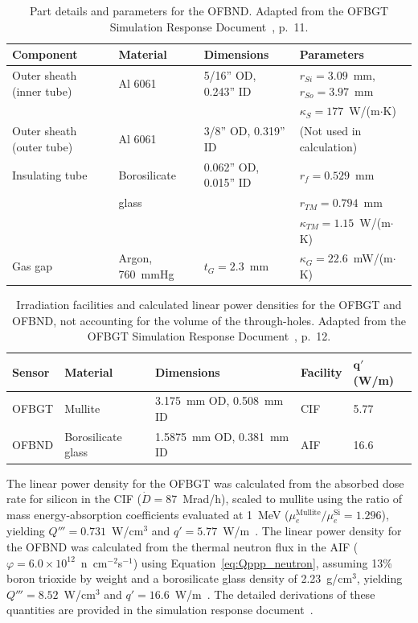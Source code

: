 \begin{table}[htbp]
\centering
\caption[OFBND design parameters.]{Part details and parameters for the OFBND.  Adapted from the OFBGT Simulation Response Document~\cite{SimReport2023}, p.~11.}
\label{tab:ofbnd_params}
\begin{tabular}{l l l l}
\hline
\textbf{Component} & \textbf{Material} & \textbf{Dimensions} & \textbf{Parameters} \\
\hline
Outer sheath (inner tube) & Al 6061 & 5/16'' OD, 0.243'' ID & $r_{Si} = 3.09$~mm, $r_{So} = 3.97$~mm \\
 & & & $\kappa_S = 177$~W/(m$\cdot$K) \\
Outer sheath (outer tube) & Al 6061 & 3/8'' OD, 0.319'' ID & (Not used in calculation) \\
Insulating tube & Borosilicate & 0.062'' OD, 0.015'' ID & $r_f = 0.529$~mm \\
 & glass & & $r_{TM} = 0.794$~mm \\
 & & & $\kappa_{TM} = 1.15$~W/(m$\cdot$K) \\
Gas gap & Argon, 760~mmHg & $t_G = 2.3$~mm & $\kappa_G = 22.6$~mW/(m$\cdot$K) \\
\hline
\end{tabular}
\end{table}

\begin{table}[htbp]
\centering
\caption[Linear power densities for the OFBGT and OFBND.]{Irradiation facilities and calculated linear power densities for the OFBGT and OFBND, not accounting for the volume of the through-holes.  Adapted from the OFBGT Simulation Response Document~\cite{SimReport2023}, p.~12.}
\label{tab:qprime}
\begin{tabular}{l l l l l}
\hline
\textbf{Sensor} & \textbf{Material} & \textbf{Dimensions} & \textbf{Facility} & $\mathbf{q'}$ \textbf{(W/m)} \\
\hline
OFBGT & Mullite & 3.175~mm OD, 0.508~mm ID & CIF & 5.77 \\
OFBND & Borosilicate glass & 1.5875~mm OD, 0.381~mm ID & AIF & 16.6 \\
\hline
\end{tabular}
\end{table}

The linear power density for the OFBGT was calculated from the absorbed dose rate for silicon in the CIF ($\dot{D} = 87$~Mrad/h), scaled to mullite using the ratio of mass energy-absorption coefficients evaluated at 1~MeV ($\mu_e^\mathrm{Mullite}/\mu_e^\mathrm{Si} = 1.296$), yielding $Q''' = 0.731$~W/cm$^3$ and $q' = 5.77$~W/m~\cite{SimReport2023}.  The linear power density for the OFBND was calculated from the thermal neutron flux in the AIF ($\varphi = 6.0 \times 10^{12}$~n~cm$^{-2}$s$^{-1}$) using Equation~\ref{eq:Qppp_neutron}, assuming 13\% boron trioxide by weight and a borosilicate glass density of 2.23~g/cm$^3$, yielding $Q''' = 8.52$~W/cm$^3$ and $q' = 16.6$~W/m~\cite{SimReport2023}.  The detailed derivations of these quantities are provided in the simulation response document~\cite{SimReport2023}.

